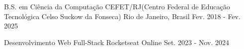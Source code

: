

\begin{cventries}

  \cventry
    {B.S. em Ciência da Computação} %
    {CEFET/RJ(Centro Federal de Educação Tecnológica Celso Suckow da Fonseca)} %
    {Rio de Janeiro, Brasil} %
    {Fev. 2018 - Fev. 2025} %
    {}

  \cventry
    {Desenvolvimento Web Full-Stack} %
    {Rocketseat} %
    {Online} %
    {Set. 2023 - Nov. 2024} %
    {}

\end{cventries}
